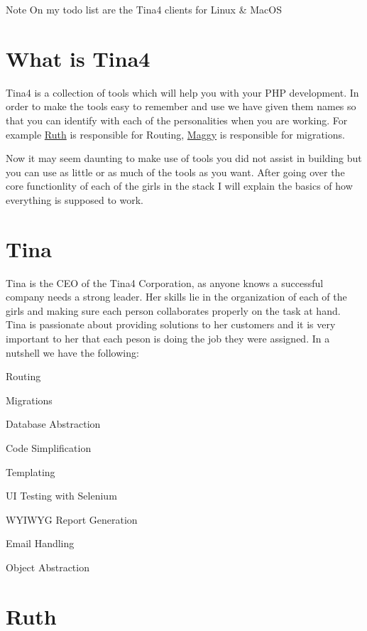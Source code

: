 \begin{DoxyNote}{Note}
On my todo list are the Tina4 clients for Linux \& Mac\+O\+S
\end{DoxyNote}
\hypertarget{index_what_is_tina4}{}\section{What is Tina4}\label{index_what_is_tina4}
Tina4 is a collection of tools which will help you with your P\+H\+P development. In order to make the tools easy to remember and use we have given them names so that you can identify with each of the personalities when you are working. For example \hyperlink{classRuth}{Ruth} is responsible for Routing, \hyperlink{classMaggy}{Maggy} is responsible for migrations.

Now it may seem daunting to make use of tools you did not assist in building but you can use as little or as much of the tools as you want. After going over the core functionlity of each of the girls in the stack I will explain the basics of how everything is supposed to work.\hypertarget{index_tina}{}\section{Tina}\label{index_tina}
Tina is the C\+E\+O of the Tina4 Corporation, as anyone knows a successful company needs a strong leader. Her skills lie in the organization of each of the girls and making sure each person collaborates properly on the task at hand. Tina is passionate about providing solutions to her customers and it is very important to her that each peson is doing the job they were assigned. In a nutshell we have the following\+:


\begin{DoxyItemize}
\item Routing  
\item Migrations  
\item Database Abstraction  
\item Code Simplification  
\item Templating  
\item U\+I Testing with Selenium  
\item W\+Y\+I\+W\+Y\+G Report Generation  
\item Email Handling  
\item Object Abstraction  
\end{DoxyItemize}\hypertarget{index_ruth}{}\section{Ruth}\label{index_ruth}


